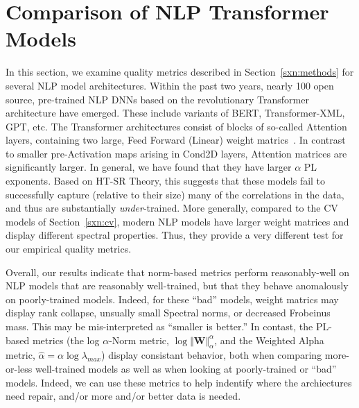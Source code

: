 \section{Comparison of NLP Transformer Models}
\label{sxn:nlp}

In this section, we examine quality metrics described in Section~\ref{sxn:methods} for several NLP model architectures.
%
Within the past two years, nearly 100 open source, pre-trained NLP DNNs based on the revolutionary Transformer architecture have emerged.
These include variants of BERT, Transformer-XML, GPT, etc.
%
The Transformer architectures consist of blocks of so-called Attention layers, containing two large, Feed Forward (Linear) weight matrics~\cite{Attn2017}. 
In contrast to smaller pre-Activation maps arising in Cond2D layers, Attention matrices are significantly larger.
In general, we have found that they have larger $\alpha$ PL exponents.
Based on HT-SR Theory, 
this suggests that these models fail to successfully capture (relative to their size) many of the correlations in the data, and thus are substantially \emph{under}-trained.
%
More generally, compared to the CV models of Section~\ref{sxn:cv},
modern NLP models have larger weight matrices and display different spectral properties.
Thus, they provide a very different test for our empirical quality metrics.

Overall, our results indicate that norm-based metrics perform reasonably-well on NLP models that are reasonably well-trained, but that they behave anomalously on poorly-trained models.
Indeed, for these ``bad'' models, weight matrics may display rank collapse, unsually small Spectral norms, or decreased Frobeinus mass. 
This may be mis-interpreted as ``smaller is better.''
In contast, the PL-based metrics (the log $\alpha$-Norm metric, 
$\log\Vert\mathbf{W}\Vert_{\alpha}^{\alpha}$, and the Weighted Alpha metric, $\hat\alpha =\alpha\log\lambda_{max} $) display consistant behavior, both when comparing more-or-less well-trained models as well as when looking at poorly-trained or ``bad'' models.
Indeed, we can use these metrics to help indentify where the archiectures need repair, and/or more and/or better data is needed.

